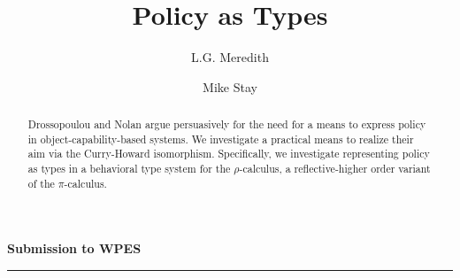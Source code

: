 \documentclass[]{amsart}
\theoremstyle{definition}
\theoremstyle{remark}
\numberwithin{equation}{subsection}
\newcommand{\pic}{$\pi$-calculus}
\newcommand{\rhoc}{$\rho$-calculus}
\newcommand{\papertitle}{Policy as Types}
\begin{document}
\lstset{language=}

\setlength{\topmargin}{0in}
\setlength{\textheight}{8.5in}
\setlength{\parskip}{6pt}

\title{\papertitle}

\author{ L.G. Meredith }
\author{ Mike Stay }







\dedicatory{}



\begin{abstract}
\normalsize{ 

  Drossopoulou and Nolan \cite{Drossopoulou:2013:NCP:2489804.2489811}
  argue persuasively for the need for a means to express policy in
  object-capability-based systems. We investigate a practical means to
  realize their aim via the Curry-Howard isomorphism. Specifically, we
  investigate representing policy as types in a behavioral type system
  for the \rhoc, a reflective-higher order variant of the \pic.

}

\end{abstract}

\noindent
{\large \textbf{Submission to WPES}}\\
\rule{6.25in}{0.75pt}\\\\\\

\maketitle
\end{document}

